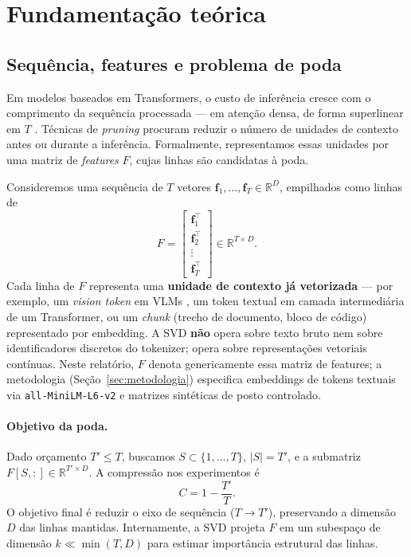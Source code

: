 \section{Fundamentação teórica}\label{sec:fundamentacao}

\subsection{Sequência, features e problema de poda}\label{sec:contexto-f}

Em modelos baseados em Transformers, o custo de inferência cresce com o comprimento da sequência processada --- em atenção densa, de forma superlinear em $T$ \cite{chen2024fastv}. Técnicas de \emph{pruning} procuram reduzir o número de unidades de contexto antes ou durante a inferência. Formalmente, representamos essas unidades por uma matriz de \emph{features} $F$, cujas linhas são candidatas à poda.

Consideremos uma sequência de $T$ vetores $\mathbf{f}_1, \ldots, \mathbf{f}_T \in \mathbb{R}^D$, empilhados como linhas de
$$
F = \begin{bmatrix} \mathbf{f}_1^\top \\ \mathbf{f}_2^\top \\ \vdots \\ \mathbf{f}_T^\top \end{bmatrix} \in \mathbb{R}^{T \times D}.
$$
Cada linha de $F$ representa uma \textbf{unidade de contexto já vetorizada} --- por exemplo, um \emph{vision token} em VLMs \cite{apedo2026svdprune}, um token textual em camada intermediária de um Transformer, ou um \emph{chunk} (trecho de documento, bloco de código) representado por embedding. A SVD \textbf{não} opera sobre texto bruto nem sobre identificadores discretos do tokenizer; opera sobre representações vetoriais contínuas. Neste relatório, $F$ denota genericamente essa matriz de features; a metodologia (Seção~\ref{sec:metodologia}) especifica embeddings de tokens textuais via \texttt{all-MiniLM-L6-v2} e matrizes sintéticas de posto controlado.

\paragraph{Objetivo da poda.}
Dado orçamento $T' \leq T$, buscamos $S \subset \{1, \ldots, T\}$, $|S| = T'$, e a submatriz $F[S,:] \in \mathbb{R}^{T' \times D}$. A compressão nos experimentos é
$$
C = 1 - \frac{T'}{T}.
$$
O objetivo final é reduzir o eixo de sequência ($T \to T'$), preservando a dimensão $D$ das linhas mantidas. Internamente, a SVD projeta $F$ em um subespaço de dimensão $k \ll \min(T,D)$ para estimar importância estrutural das linhas.

